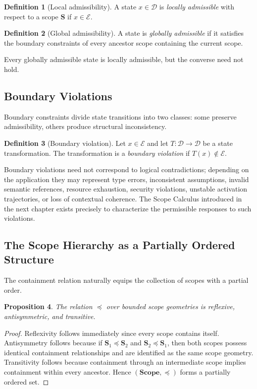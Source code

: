\documentclass[11pt,twoside,openright]{book}
\numberwithin{equation}{chapter}
\theoremstyle{definition}
\newtheorem{definition}{Definition}[chapter]
\theoremstyle{plain}
\newtheorem{proposition}[definition]{Proposition}
\theoremstyle{remark}
\theoremstyle{definition}
\newcommand{\CatScope}{\mathbf{Scope}}
\newcommand{\Scope}{\mathbf{S}}
\newcommand{\Interior}{\mathcal{E}}
\newcommand{\Domain}{\mathcal{D}}
\begin{document}
\begin{definition}[Local admissibility]
A state $x\in\Domain$ is \emph{locally admissible} with respect to a scope
$\Scope$ if $x\in\Interior$.
\end{definition}

\begin{definition}[Global admissibility]
A state is \emph{globally admissible} if it satisfies the boundary
constraints of every ancestor scope containing the current scope.
\end{definition}

Every globally admissible state is locally admissible, but the converse
need not hold.

\subsection{Boundary Violations}

Boundary constraints divide state transitions into two classes: some
preserve admissibility, others produce structural inconsistency.

\begin{definition}[Boundary violation]
Let $x\in\Interior$ and let $T:\Domain\to\Domain$ be a state
transformation. The transformation is a \emph{boundary violation} if
$T(x)\notin\Interior$.
\end{definition}

Boundary violations need not correspond to logical contradictions;
depending on the application they may represent type errors, inconsistent
assumptions, invalid semantic references, resource exhaustion, security
violations, unstable activation trajectories, or loss of contextual
coherence. The Scope Calculus introduced in the next chapter exists
precisely to characterize the permissible responses to such violations.

\subsection{The Scope Hierarchy as a Partially Ordered Structure}

The containment relation naturally equips the collection of scopes with a
partial order.

\begin{proposition}
The relation $\preceq$ over bounded scope geometries is reflexive,
antisymmetric, and transitive.
\end{proposition}

\begin{proof}
Reflexivity follows immediately since every scope contains itself.
Antisymmetry follows because if $\Scope_1\preceq\Scope_2$ and
$\Scope_2\preceq\Scope_1$, then both scopes possess identical containment
relationships and are identified as the same scope geometry. Transitivity
follows because containment through an intermediate scope implies
containment within every ancestor. Hence $(\CatScope,\preceq)$ forms a
partially ordered set.
\end{proof}
\end{document}
